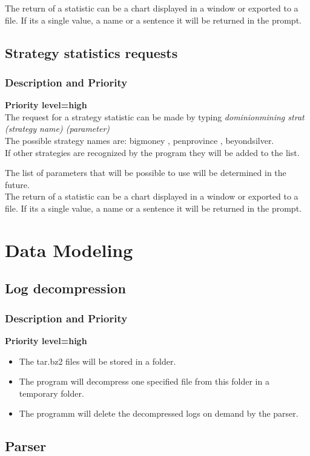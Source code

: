 \documentclass{scrreprt}
\begin{document}
The return of a statistic can be a chart displayed in a window or exported to a
file. If its a single value, a name or a sentence it will be returned in the prompt.

\subsection{Strategy statistics requests}
\subsubsection{Description and Priority}
\textbf{Priority level=high}\\
The request for a strategy statistic can be made by typing \textit{dominionmining strat (strategy name) (parameter)}\\
The possible strategy names are:
bigmoney , penprovince , beyondsilver.\\
If other strategies are recognized by the program they will be added to the list.

The list of parameters that will be possible to use will be determined in the
future.\\
The return of a statistic can be a chart displayed in a window or exported to a
file. If its a single value, a name or a sentence it will be returned in the prompt.
\section{Data Modeling}

\subsection{Log decompression}
\subsubsection{Description and Priority}
\textbf{Priority level=high}\\


\begin{itemize}
  \item The tar.bz2 files will be stored in a folder.
  \item The program will decompress one specified file from this folder in a temporary folder.
  \item The programm will delete the decompressed logs on demand by the parser.
\end{itemize}

\subsection{Parser}
\end{document}
